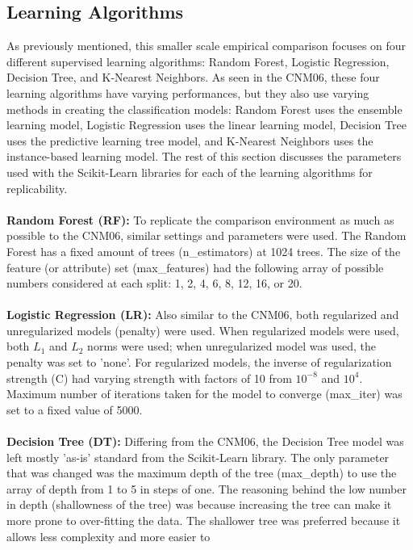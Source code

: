\documentclass[twoside,11pt]{article}
\begin{document}
\subsection{Learning Algorithms}

As previously mentioned, this smaller scale empirical comparison focuses on 
four different supervised learning algorithms: Random Forest, Logistic 
Regression, Decision Tree, and K-Nearest Neighbors. As seen in the CNM06, 
these four learning algorithms have varying performances, but they also 
use varying methods in creating the classification models: Random Forest 
uses the ensemble learning model, Logistic Regression uses the linear learning
model, Decision Tree uses the predictive learning tree model, and 
K-Nearest Neighbors uses the instance-based learning model. The rest of 
this section discusses the parameters used with the Scikit-Learn libraries 
for each of the learning algorithms for replicability. \\
\\
\textbf{Random Forest (RF):} To replicate the comparison environment as much 
as possible to the CNM06, similar settings and parameters were used. The 
Random Forest has a fixed amount of trees (n\_estimators) at 1024 trees. 
The size of the feature (or attribute) set (max\_features) had the following 
array of possible numbers considered at each split: 1, 2, 4, 6, 8, 12, 16, 
or 20. \\
\\
\textbf{Logistic Regression (LR):} Also similar to the CNM06, both 
regularized and unregularized models (penalty) were used. When regularized 
models were used, both \(L_1\) and \(L_2\) norms were used; when unregularized 
model was used, the penalty was set to 'none'. For regularized models, the 
inverse of regularization strength (C) had varying strength with factors of 10 
from \(10^{-8}\) and \(10^4\). Maximum number of iterations taken for the 
model to converge (max\_iter) was set to a fixed value of 5000.\\
\\
\textbf{Decision Tree (DT):} Differing from the CNM06, the Decision Tree 
model was left mostly 'as-is' standard from the Scikit-Learn library. The 
only parameter that was changed was the maximum depth of the tree (max\_depth)
to use the array of depth from 1 to 5 in steps of one. The reasoning behind 
the low number in depth (shallowness of the tree) was because increasing 
the tree can make it more prone to over-fitting the data. The shallower 
tree was preferred because it allows less complexity and more easier to
\end{document}
